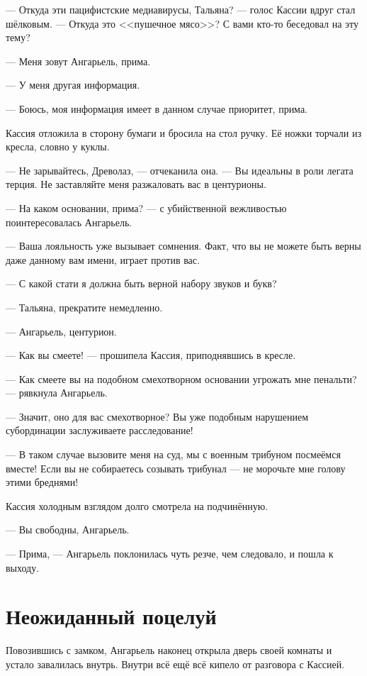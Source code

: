 --- Откуда эти пацифистские медиавирусы, Тальяна? --- голос Кассии вдруг стал шёлковым.
--- Откуда это <<пушечное мясо>>?
С вами кто-то беседовал на эту тему?

--- Меня зовут Ангарьель, прима.

--- У меня другая информация.

--- Боюсь, моя информация имеет в данном случае приоритет, прима.

Кассия отложила в сторону бумаги и бросила на стол ручку.
Её ножки торчали из кресла, словно у куклы.

--- Не зарывайтесь, Древолаз, --- отчеканила она.
--- Вы идеальны в роли легата терция.
Не заставляйте меня разжаловать вас в центурионы.

--- На каком основании, прима? --- с убийственной вежливостью поинтересовалась Ангарьель.

--- Ваша лояльность уже вызывает сомнения.
Факт, что вы не можете быть верны даже данному вам имени, играет против вас.

--- С какой стати я должна быть верной набору звуков и букв?

--- Тальяна, прекратите немедленно.

--- Ангарьель, центурион.

--- Как вы смеете! --- прошипела Кассия, приподнявшись в кресле.

--- Как смеете вы на подобном смехотворном основании угрожать мне пенальти? --- рявкнула Ангарьель.

--- Значит, оно для вас смехотворное?
Вы уже подобным нарушением субординации заслуживаете расследование!

--- В таком случае вызовите меня на суд, мы с военным трибуном посмеёмся вместе!
Если вы не собираетесь созывать трибунал --- не морочьте мне голову этими бреднями!

Кассия холодным взглядом долго смотрела на подчинённую.

--- Вы свободны, Ангарьель.

--- Прима, --- Ангарьель поклонилась чуть резче, чем следовало, и пошла к выходу.

\section{Неожиданный поцелуй}

Повозившись с замком, Ангарьель наконец открыла дверь своей комнаты и устало завалилась внутрь.
Внутри всё ещё всё кипело от разговора с Кассией.

